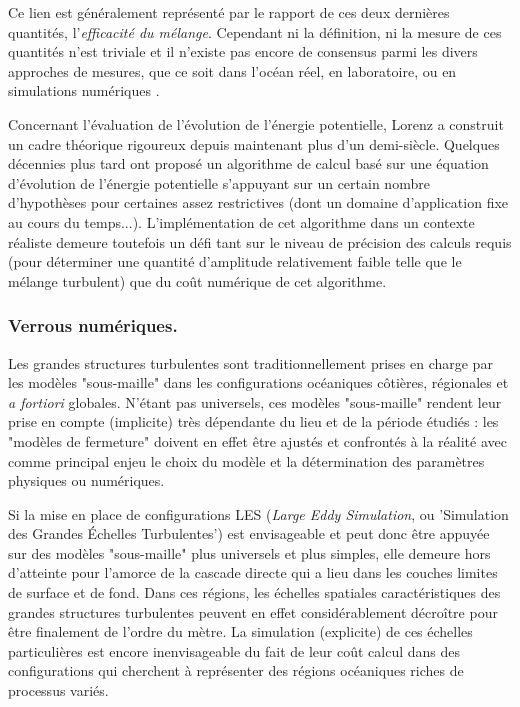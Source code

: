Ce lien est généralement représenté par le rapport de ces deux dernières quantités, l'\textit{efficacité du mélange}. Cependant ni la définition, ni la mesure de ces quantités n'est triviale et il n'existe pas encore de consensus parmi les divers approches de mesures, que ce soit dans l'océan réel, en laboratoire, ou en simulations numériques \citep{gregg_2018}. 

Concernant l'évaluation de l'évolution de l'énergie potentielle, Lorenz \citep{lorenz_available_1955} a construit un cadre théorique rigoureux depuis maintenant plus d'un demi-siècle. Quelques décennies plus tard \cite{winters_available_1995} ont proposé un algorithme de calcul basé sur une équation d'évolution de l'énergie potentielle s'appuyant sur un certain nombre d'hypothèses pour certaines assez restrictives (dont un domaine d'application fixe au cours du temps...). L'implémentation de cet algorithme dans un contexte réaliste demeure toutefois un défi tant sur le niveau de précision des calculs requis (pour déterminer une quantité d'amplitude relativement faible telle que le mélange turbulent) que du coût numérique de cet algorithme.


\subsubsection{Verrous numériques.}
Les grandes structures turbulentes sont traditionnellement prises en charge par les modèles "sous-maille" dans les configurations océaniques côtières, régionales et \textit{a fortiori} globales. N'étant pas universels, ces modèles "sous-maille" rendent leur prise en compte (implicite) très dépendante du lieu et de la période étudiés : les "modèles de fermeture" doivent en effet être ajustés et confrontés à la réalité avec comme principal enjeu le choix du modèle et la détermination des paramètres physiques ou numériques.

Si la mise en place de configurations LES (\textit{Large Eddy Simulation}, ou 'Simulation des Grandes Échelles Turbulentes') est envisageable et peut donc être appuyée sur des modèles "sous-maille" plus universels et plus simples, elle demeure hors d’atteinte pour l'amorce de la cascade directe qui a lieu dans les couches limites de surface et de fond. Dans ces régions, les échelles spatiales caractéristiques des grandes structures turbulentes peuvent en effet considérablement décroître pour être finalement de l'ordre du mètre. La simulation (explicite) de ces échelles particulières est encore inenvisageable du fait de leur coût calcul dans des configurations qui cherchent à représenter des régions océaniques riches de processus variés. 

